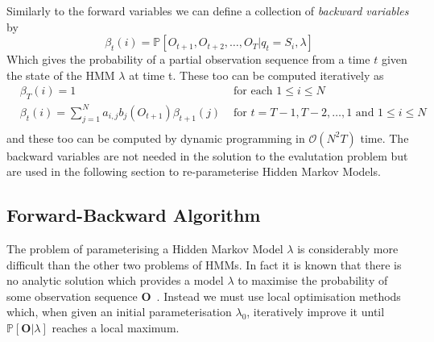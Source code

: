 Similarly to the forward variables we can define a collection of \emph{backward variables} by
\begin{equation*}
\beta_t(i) = \mathbb{P}[O_{t+1}, O_{t+2}, \dots, O_T | q_t = S_i, \lambda]
\end{equation*}
Which gives the probability of a partial observation sequence from a time $t$ given the state of the HMM $\lambda$ at time t. These too can be computed iteratively as
\begin{align*}
&\beta_T(i) = 1 &\text{ for each } 1 \leq i \leq N \\
&\beta_t(i)  = \sum_{j=1}^N a_{i,j}b_j(O_{t+1})\beta_{t+1}(j) &\text{ for } t = T-1, T-2,\dots,1 \text{ and } 1 \leq i \leq N \\
\end{align*}
and these too can be computed by dynamic programming in $\mathcal{O}(N^2T)$ time. The backward variables are not needed in the solution to the evalutation problem but are used in the following section to re-parameterise Hidden Markov Models. 

\subsection{Forward-Backward Algorithm}
The problem of parameterising a Hidden Markov Model $\lambda$ is considerably more difficult than the other two problems of HMMs. In fact it is known that there is no analytic solution which provides a model $\lambda$ to maximise the probability of some observation sequence $\bm{O}$~\citep{rabiner1989tutorial}. Instead we must use local optimisation methods which, when given an initial parameterisation $\lambda_0$, iteratively improve it until $\mathbb{P}[\bm{O} | \lambda]$ reaches a local maximum. 

